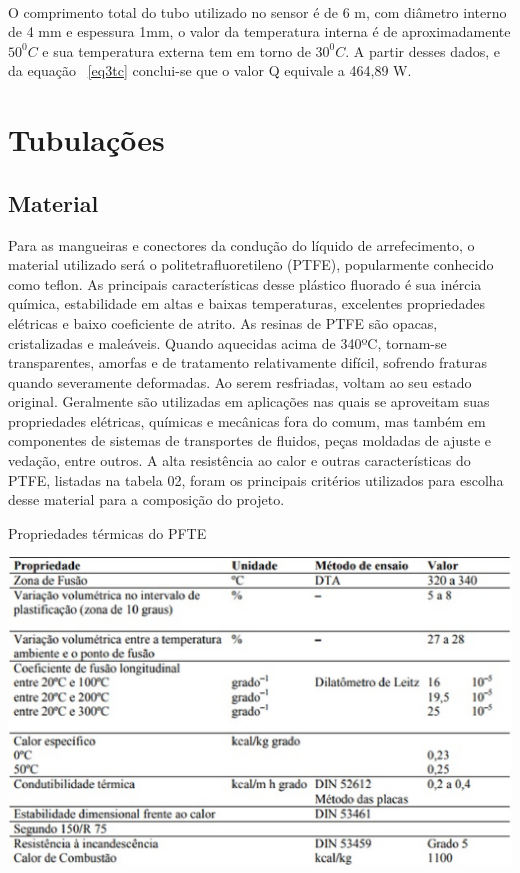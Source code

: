 \\O comprimento total do tubo utilizado no sensor é de 6 m, com diâmetro interno de 4 mm e espessura 1mm, o valor da temperatura interna é de aproximadamente $50^0C$ e sua temperatura externa tem em torno de $30^0C$. A partir desses dados, e da equação ~\ref{eq3tc} conclui-se que o valor Q equivale a 464,89 W.
\section{Tubulações}
\subsection{Material}
Para as mangueiras e conectores da condução do líquido de arrefecimento, o material utilizado será o politetrafluoretileno (PTFE), popularmente conhecido como teflon. As principais características desse plástico fluorado é sua inércia química, estabilidade em altas e baixas temperaturas, excelentes propriedades elétricas e baixo coeficiente de atrito. 
As resinas de PTFE são opacas, cristalizadas e maleáveis. Quando aquecidas acima de 340ºC, tornam-se transparentes, amorfas e de tratamento relativamente difícil, sofrendo fraturas quando severamente deformadas. Ao serem resfriadas, voltam ao seu estado original. 
Geralmente são utilizadas em aplicações nas quais se aproveitam suas propriedades elétricas, químicas e mecânicas fora do comum, mas também em componentes de sistemas de transportes de fluidos, peças moldadas de ajuste e vedação, entre outros. 
A alta resistência ao calor e outras características do PTFE, listadas na tabela 02, foram os principais critérios utilizados para escolha desse material para a composição do projeto. 
\begin{table}[!htb]
	\centering
	\caption{Propriedades térmicas do PFTE}\label{tab2tc}
	\includegraphics[scale=0.8]{figuras/Figura5tc.eps}
\end{table}
